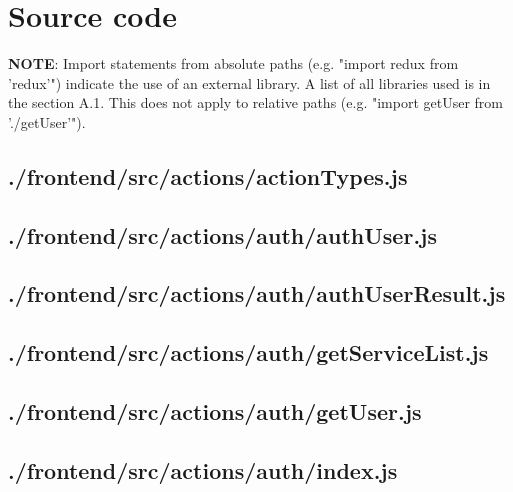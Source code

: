 \documentclass[11pt]{informatics-report}
\begin{document}
\tableofcontents

\appendix




\chapter{Source code}


\textbf{NOTE}: Import statements from absolute paths (e.g. "import redux from 'redux'") indicate the use of an external library. A list of all libraries used is in the section A.1. This does not apply to relative paths (e.g. "import getUser from './getUser'").

\newpage
\section{./frontend/src/actions/actionTypes.js}


\newpage
\section{./frontend/src/actions/auth/authUser.js}


\newpage
\section{./frontend/src/actions/auth/authUserResult.js}


\newpage
\section{./frontend/src/actions/auth/getServiceList.js}


\newpage
\section{./frontend/src/actions/auth/getUser.js}


\newpage
\section{./frontend/src/actions/auth/index.js}

\end{document}
